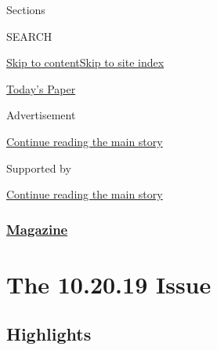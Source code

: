 Sections

SEARCH

\protect\hyperlink{site-content}{Skip to
content}\protect\hyperlink{site-index}{Skip to site index}

\href{https://myaccount.nytimes3xbfgragh.onion/auth/login?response_type=cookie\&client_id=vi}{}

\href{https://www.nytimes3xbfgragh.onion/section/todayspaper}{Today's
Paper}

Advertisement

\protect\hyperlink{after-top}{Continue reading the main story}

Supported by

\protect\hyperlink{after-sponsor}{Continue reading the main story}

\hypertarget{magazine}{%
\subsubsection{\texorpdfstring{\href{/section/magazine}{Magazine}}{Magazine}}\label{magazine}}

\hypertarget{the-102019-issue}{%
\section{The 10.20.19 Issue}\label{the-102019-issue}}

\hypertarget{highlights}{%
\subsection{Highlights}\label{highlights}}

